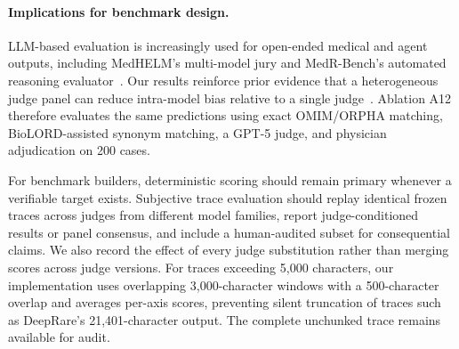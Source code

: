 \documentclass[letterpaper]{article} %
\begin{document}
\paragraph{Implications for benchmark design.}
LLM-based evaluation is increasingly used for open-ended medical and agent outputs, including MedHELM's multi-model jury and MedR-Bench's automated reasoning evaluator~\cite{bedi2026medhelm,qiu2025medrbench}. Our results reinforce prior evidence that a heterogeneous judge panel can reduce intra-model bias relative to a single judge~\cite{verga2024juries}. Ablation A12 therefore evaluates the same predictions using exact OMIM/ORPHA matching, BioLORD-assisted synonym matching, a GPT-5 judge, and physician adjudication on 200 cases.

For benchmark builders, deterministic scoring should remain primary whenever a verifiable target exists. Subjective trace evaluation should replay identical frozen traces across judges from different model families, report judge-conditioned results or panel consensus, and include a human-audited subset for consequential claims. We also record the effect of every judge substitution rather than merging scores across judge versions. For traces exceeding 5,000 characters, our implementation uses overlapping 3,000-character windows with a 500-character overlap and averages per-axis scores, preventing silent truncation of traces such as DeepRare's 21,401-character output. The complete unchunked trace remains available for audit.


\end{document}
